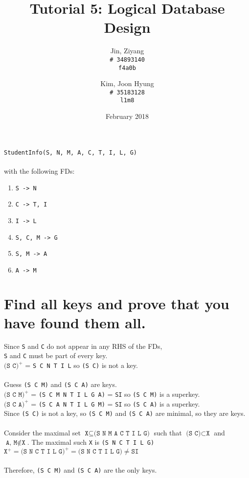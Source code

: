 \documentclass{article}
\title{Tutorial 5: Logical Database Design}
\author{
	Jin, Ziyang\\
	\texttt{\# 34893140}\\
	\texttt{f4a0b}
	\and
	Kim, Joon Hyung\\
	\texttt{\# 35183128}\\
	\texttt{l1m8}
}
\date{February 2018}
\begin{document}
	\maketitle
	\texttt{StudentInfo(S, N, M, A, C, T, I, L, G)}\\
	\\
	with the following FDs:
	\begin{enumerate}
		\item \texttt{S -> N}
		\item \texttt{C -> T, I}
		\item \texttt{I -> L}
		\item \texttt{S, C, M -> G}
		\item \texttt{S, M -> A}
		\item \texttt{A -> M}
	\end{enumerate}
	
\section{Find all keys and prove that you have found them all.}

Since \texttt{S} and \texttt{C} do not appear in any RHS of the FDs, \\
\texttt{S} and \texttt{C} must be part of every key. \\
\( \texttt{(S C)}^+ \) = \texttt{S C N T I L} so \texttt{(S C)} is not a key.\\
\\
Guess \texttt{(S C M)} and \texttt{(S C A)} are keys. \\
\( \texttt{(S C M)}^+ \) = \texttt{(S C M N T I L G A)} = \texttt{SI} so \texttt{(S C M)} is a superkey.\\
\( \texttt{(S C A)}^+ \) = \texttt{(S C A N T I L G M)} = \texttt{SI} so \texttt{(S C A)} is a superkey.\\
Since \texttt{(S C)} is not a key, so \texttt{(S C M)} and \texttt{(S C A)} are minimal, so they are keys. \\
\\
Consider the maximal set \( \texttt{X}  \subseteq \texttt{(S N M A C T I L G)} \) such that \( \texttt{(S C)} \subset \texttt{X}\) and \( \texttt{A, M} \notin \texttt{X} \). The maximal such \texttt{X} is \texttt{(S N C T I L G)} \\
\( \texttt{X}^+ = \texttt{(S N C T I L G)}^+ = \texttt{(S N C T I L G)} \neq \texttt{SI} \)\\
\\
Therefore, \texttt{(S C M)} and \texttt{(S C A)} are the only keys.\\
\end{document}

